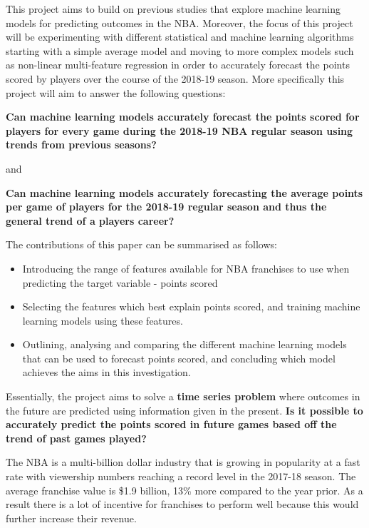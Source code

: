 \documentclass[a4paper,11pt,twoside]{article}
\begin{document}
This project aims to build on previous studies that explore machine learning models for predicting outcomes in the NBA. Moreover, the focus of this project will be experimenting with different statistical and machine learning algorithms starting with a simple average model and moving to more complex models such as non-linear multi-feature regression in order to accurately forecast the points scored by players over the course of the 2018-19 season. More specifically this project will aim to answer the following questions:

\begin{center}
\textbf{Can machine learning models accurately forecast the points scored for players for every game during the 2018-19 NBA regular season using trends from previous seasons?}

and 

\textbf{Can machine learning models accurately forecasting the average points per game of players for the 2018-19 regular season and thus the general trend of a players career?}
\end{center}
\vspace{7mm}

The contributions of this paper can be summarised as follows:
\begin{itemize}
    \item Introducing the range of features available for NBA franchises to use when predicting the target variable - points scored
    \item Selecting the features which best explain points scored, and training machine learning models using these features.
    \item Outlining, analysing and comparing the different machine learning models that can be used to forecast points scored, and concluding which model achieves the aims in this investigation.
\end{itemize}
Essentially, the project aims to solve a \textbf{time series problem} where outcomes in the future are predicted using information given in the present. \textbf{Is it possible to accurately predict the points scored in future games based off the trend of past games played?}

The NBA is a multi-billion dollar industry that is growing in popularity at a fast rate with viewership numbers reaching a record level in the 2017-18 season. The average franchise value is \$1.9 billion, 13\% more compared to the year prior. As a result there is a lot of incentive for franchises to perform well because this would further increase their revenue.
\end{document}
